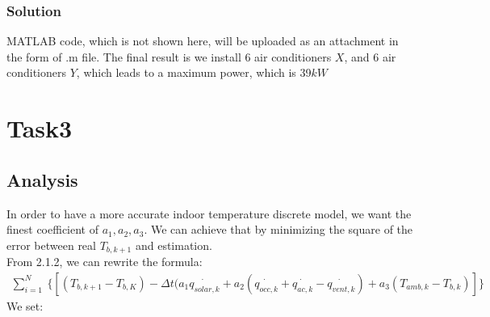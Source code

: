 \documentclass{article}
\begin{document}
        \subsubsection{Solution}
            MATLAB code, which is not shown here, will be uploaded as an attachment in the form of .m file. The final result is we install 6 air conditioners $X$, and 6 air conditioners $Y$, which leads to a maximum power, which is 39$kW$
            
    
    

            



\section{Task3}
    \subsection{Analysis}
        In order to have a more accurate indoor temperature discrete model, we want the finest coefficient of $a_1,a_2,a_3$. We can achieve that by minimizing the square of the error between real $T_{b,k+1}$ and estimation.\\
        From 2.1.2, we can rewrite the formula:
        \begin{align}\label{1.10}
            \sum_{i=1}^N \:\{[(T_{b,k+1} - T_{b,K}) - \Delta t (a_1\dot{q_{solar,k}} + a_2(\dot{q_{occ,k}}+\dot{q_{ac,k}}-\dot{q_{vent,k}}) + a_3(T_{amb,k} - T_{b,k}) ]  \}
        \end{align}
        We set:
\end{document}
